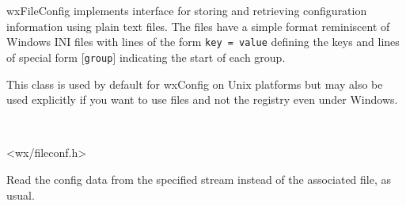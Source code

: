 
\section{}\label{wxfileconfig}

wxFileConfig implements  interface for
storing and retrieving configuration information using plain text files. The
files have a simple format reminiscent of Windows INI files with lines of the
form \texttt{key = value} defining the keys and lines of special form
\texttt{$[$group$]$} indicating the start of each group.

This class is used by default for wxConfig on Unix platforms but may also be
used explicitly if you want to use files and not the registry even under
Windows.


\\


<wx/fileconf.h>





\label{wxfileconfigctor}


Read the config data from the specified stream instead of the associated file,
as usual.




\label{wxfilenamegetglobalfile}


